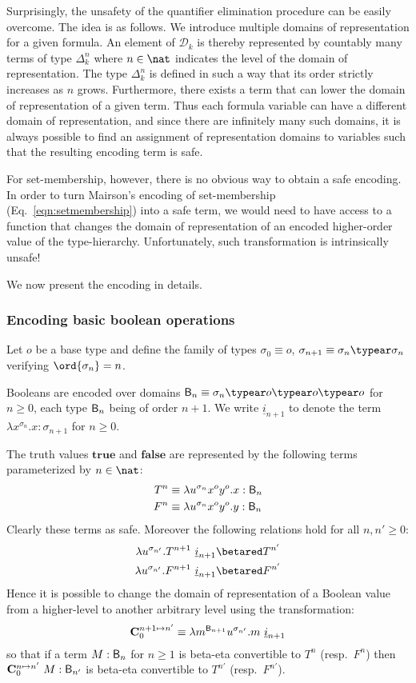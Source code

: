 Surprisingly, the unsafety of the quantifier elimination procedure can be easily overcome. The idea is as follows. We introduce multiple domains of representation for a given formula. An element of $\mathcal{D}_k$ is thereby represented by countably many terms of type $\Delta_k^n$ where $n\in\nat$ indicates the level of the domain of representation. The type $\Delta_k^n$ is defined in such a way that its order strictly increases as $n$ grows. Furthermore, there exists a term that can lower the domain of representation of a given term. Thus each formula variable can have a different domain of representation, and since there are infinitely many such domains, it is always possible to find an assignment of representation domains to variables such that the resulting encoding term is safe.

For set-membership, however, there is no obvious way to obtain a safe encoding. In order to turn Mairson's encoding of set-membership (Eq.\ \ref{eqn:setmembership}) into a safe term, we would need to have access to a function that changes the domain of representation of an encoded higher-order value of the type-hierarchy. Unfortunately, such transformation is intrinsically unsafe!
\smallskip

We now present the encoding in details.

\subsubsection{Encoding basic boolean operations}

Let $o$ be a base type and define the family of types $\sigma_0 \equiv o$, $\sigma_{n+1} \equiv \sigma_n\typear\sigma_n$ verifying $\ord{\sigma_n} = n$.


Booleans are encoded over domains $\booltype_n \equiv \sigma_n\typear o\typear o\typear o$ for $n\geq0$, each type $\mathsf{B}_n$ being of order $n+1$. We write $\underline{i}_{n+1}$ to denote the term $\lambda x^{\sigma_n}.x : \sigma_{n+1}$ for $n\geq0$.

The truth values $\mathbf{true}$ and $\mathbf{false}$ are represented by the following terms parameterized by $n \in \nat$:
\begin{align*}
  T^n &\equiv \lambda u^{\sigma_n} x^o y^o .x : \mathsf{B}_{n}\\
  F^n &\equiv \lambda u^{\sigma_n} x^o y^o .y : \mathsf{B}_{n}
\end{align*}
Clearly these terms as safe. Moreover the following relations hold for all $n,n'\geq 0$:
\begin{align*}
  \lambda u^{\sigma_{n'}} . T^{n+1}~\underline{i}_{n+1}  &\betared  T^{n'} \\
  \lambda u^{\sigma_{n'}} . F^{n+1}~\underline{i}_{n+1}  &\betared  F^{n'}
\end{align*}
Hence it is possible to change the domain of representation of a Boolean value from a higher-level to another arbitrary level using the transformation:
$$ \mathbf{C}^{n+1\mapsto n'}_0 \equiv \lambda m^{\mathsf{B}_{n+1}} u^{\sigma_{n'}}. m~\underline{i}_{n+1}$$
so that if a term $M : \mathsf{B}_n$ for $n\geq1$ is beta-eta convertible to $T^n$ (resp.\ $F^n$) then $\mathbf{C}^{n\mapsto n'}_0~M :\mathsf{B}_{n'}$ is beta-eta convertible to $T^{n'}$ (resp.\ $F^{n'}$).

